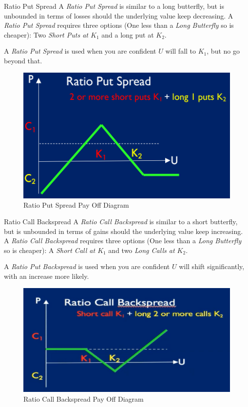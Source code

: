 \documentclass[11pt,a4paper]{article}
\begin{document}
  \begin{definition}{Ratio Put Spread}
    A \textit{Ratio Put Spread} is similar to a long butterfly, but is unbounded in terms of losses should the underlying value keep decreasing. A \textit{Ratio Put Spread} requires three options (One less than a \textit{Long Butterfly} so is cheaper):  Two \textit{Short Puts at $K_1$} and a long put at $K_2$.
    \par A \textit{Ratio Put Spread} is used when you are confident $U$ will fall to $K_1$, but no go beyond that.
  \end{definition}

  \begin{figure}[ht!]
    \centering
    \includegraphics[width=.5\textwidth]{ratioPutSpread.PNG}
    \caption{Ratio Put Spread Pay Off Diagram}
  \end{figure}

  \begin{definition}{Ratio Call Backspread}
    A \textit{Ratio Call Backspread} is similar to a short butterfly, but is unbounded in terms of gains should the underlying value keep increasing. A \textit{Ratio Call Backspread} requires three options (One less than a \textit{Long Butterfly} so is cheaper):  A \textit{Short Call at $K_1$} and two \textit{Long Calls at $K_2$}.
    \par A \textit{Ratio Put Backspread} is used when you are confident $U$ will shift significantly, with an increase more likely.
  \end{definition}

  \begin{figure}[ht!]
    \centering
    \includegraphics[width=.5\textwidth]{ratioCallBackspread.PNG}
    \caption{Ratio Call Backspread Pay Off Diagram}
  \end{figure}
\end{document}
